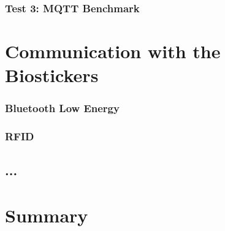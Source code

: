 \subsubsection{Test 3: \acs{MQTT} Benchmark}


\section{Communication with the Biostickers}

\subsubsection{Bluetooth Low Energy}
\subsubsection{\acf{RFID}}

\subsection{...}

\section{Summary}
\renewcommand{\arraystretch}{1}